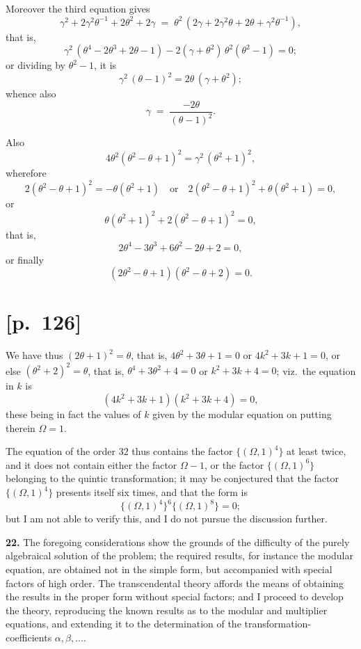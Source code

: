\documentclass[11pt]{article}
\begin{document}
Moreover the third equation gives
\[
\gamma^2 + 2\gamma^2\theta^{-1} + 2\theta^2 + 2\gamma \;=\; \theta^2\,(2\gamma + 2\gamma^2\theta + 2\theta + \gamma^2\theta^{-1}),
\]
that is,
\[
\gamma^2\,(\theta^4 - 2\theta^3 + 2\theta - 1) - 2(\gamma + \theta^2)\,\theta^2(\theta^2 - 1) = 0;
\]
or dividing by $\theta^2 - 1$, it is
\[
\gamma^2\,(\theta - 1)^2 = 2\theta\,(\gamma + \theta^2);
\]
whence also
\[
\gamma \;=\; \frac{-2\theta}{(\theta - 1)^2}.
\]

Also
\[
4\theta^2(\theta^2 - \theta + 1)^2 = \gamma^2\,(\theta^2 + 1)^2,
\]
wherefore
\[
2(\theta^2 - \theta + 1)^2 = -\theta(\theta^2 + 1)
\quad\text{or}\quad 2(\theta^2 - \theta + 1)^2 + \theta(\theta^2 + 1) = 0,
\]
or
\[
\theta(\theta^2 + 1)^2 + 2(\theta^2 - \theta + 1)^2 = 0,
\]
that is,
\[
2\theta^4 - 3\theta^3 + 6\theta^2 - 2\theta + 2 = 0,
\]
or finally
\[
(2\theta^2 - \theta + 1)(\theta^2 - \theta + 2) = 0.
\]

\section*{[p.~126]}

We have thus $(2\theta + 1)^2 = \theta$, that is, $4\theta^2 + 3\theta + 1 = 0$
or $4k^2 + 3k + 1 = 0$, or else $(\theta^2 + 2)^2 = \theta$, that is,
$\theta^4 + 3\theta^2 + 4 = 0$ or $k^2 + 3k + 4 = 0$; viz.\ the equation in
$k$ is
\[
(4k^2 + 3k + 1)(k^2 + 3k + 4) = 0,
\]
these being in fact the values of $k$ given by the modular equation on
putting therein $\Omega = 1$.

The equation of the order $32$ thus contains the factor $\{(\Omega, 1)^4\}$
at least twice, and it does not contain either the factor $\Omega - 1$, or
the factor $\{(\Omega, 1)^6\}$ belonging to the quintic transformation; it
may be conjectured that the factor $\{(\Omega, 1)^4\}$ presents itself six
times, and that the form is
\[
\bigl\{(\Omega, 1)^4\bigr\}^6 \bigl\{(\Omega, 1)^8\bigr\} = 0;
\]
but I am not able to verify this, and I do not pursue the discussion
further.

\medskip
\textbf{22.} The foregoing considerations show the grounds of the
difficulty of the purely algebraical solution of the problem; the required
results, for instance the modular equation, are obtained not in the simple
form, but accompanied with special factors of high order. The
transcendental theory affords the means of obtaining the results in the
proper form without special factors; and I proceed to develop the theory,
reproducing the known results as to the modular and multiplier equations,
and extending it to the determination of the transformation-coefficients
$\alpha,\beta,\ldots$.
\end{document}
